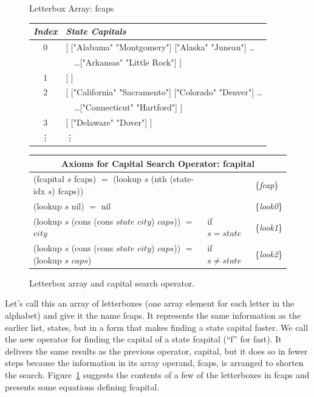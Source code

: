 \begin{figure}
\begin{center}
Letterbox Array: \textsf{fcaps}
\begin{tabular}{c|l}
\emph{Index} &\emph{State Capitals} \\
\hline
0 & \textsf{[ ["Alabama"  "Montgomery"] ["Alaska"   "Juneau"] \dots } \\
  & \textsf{~~\dots ["Arkansas"  "Little Rock"] ]}  \\ %
1 & \textsf{[ ]}\\
2 & \textsf{[ ["California"  "Sacramento"] ["Colorado"  "Denver"] \dots } \\
  & \textsf{~~\dots ["Connecticut"  "Hartford"] }]\\
3 & \textsf{[ ["Delaware"  "Dover"] ]}\\
\vdots & \hspace*{15mm}\vdots\\
\end{tabular}
\begin{tabular}{lll}
\multicolumn{3}{c}{Axioms for Capital Search Operator: \textsf{fcapital}}\\
\hline
\textsf{(fcapital} $s$ \textsf{fcaps)} $=$ \textsf{(lookup} $s$ \textsf{(nth (state-idx} $s$) \textsf{fcaps))} && \{\emph{fcap}\} \\
\textsf{(lookup} $s$ \textsf{nil)} $=$ \textsf{nil}  && \{\emph{look0}\}     \\
\textsf{(lookup} $s$ \textsf{(cons (cons} $state$ $city$\textsf{)} $caps$\textsf{))} $=$ $city$ &if $s = state$ & \{\emph{look1}\} \\
\textsf{(lookup} $s$ \textsf{(cons (cons} $state$ $city$) $caps$\textsf{))} $=$ \textsf{(lookup} $s$ $caps$\textsf{)} &if $s \ne state$ & \{\emph{look2}\} \\
\end{tabular}
\end{center}
\caption{Letterbox array and capital search operator.}
\label{fig:fcaps-array}
\end{figure}

Let's call this an array of letterboxes
(one array element for each letter in the alphabet)
and give it the name \textsf{fcaps}.
It represents the same information as the earlier list, \textsf{states},
but in a form that makes finding a state capital faster.
We call the new operator for finding the capital of a state
\textsf{fcapital} (``f'' for fast).
It delivers the same results
as the previous operator, \textsf{capital},
but it does so in fewer steps because the information in its array operand,
\textsf{fcaps}, is arranged to shorten the search.
Figure~\ref{fig:fcaps-array} suggests the contents of a few
of the letterboxes in \textsf{fcaps} and presents some
equations defining \textsf{fcapital}.

